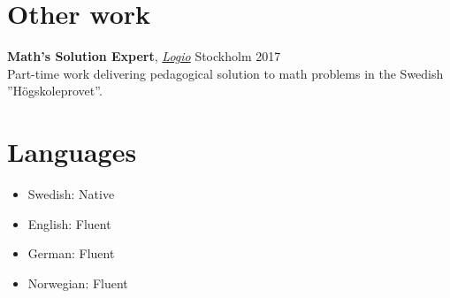 \documentclass[11pt, a4paper]{article}
\begin{document}
\section*{Other work}
\textbf{Math's Solution Expert}, \textit{\href{https://logio.se}{Logio}} Stockholm \hfill 2017 \\
    Part-time work delivering pedagogical solution to math problems in the Swedish
    ”Högskoleprovet”.


\section*{Languages}
\begin{itemize}[noitemsep]
    \item Swedish: Native
    \item English: Fluent
    \item German: Fluent
    \item Norwegian: Fluent
\end{itemize}
\end{document}
